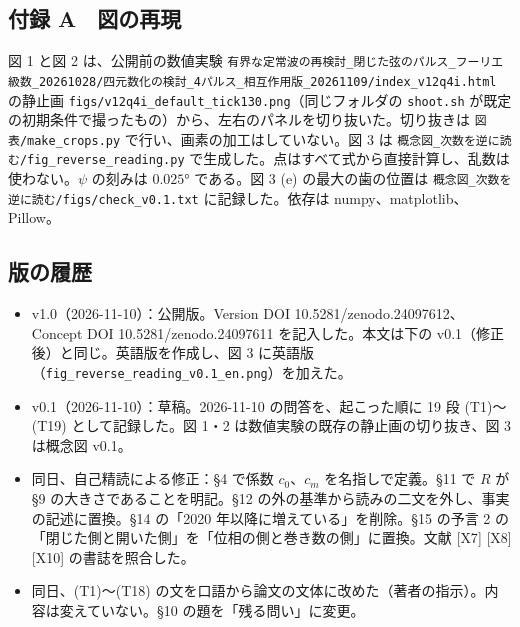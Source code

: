 \documentclass[
  a4paper,
]{ltjsarticle}
\providecommand{\tightlist}{%
  \setlength{\itemsep}{0pt}\setlength{\parskip}{0pt}}
\begin{document}
\subsection{付録
A　図の再現}\label{ux4ed8ux9332-a-ux56f3ux306eux518dux73fe}

図 1 と図 2 は、公開前の数値実験
\texttt{有界な定常波の再検討\_\allowbreak{}閉じた弦のパルス\_\allowbreak{}フーリエ級数\_\allowbreak{}20261028/\allowbreak{}四元数化の検討\_\allowbreak{}4パルス\_\allowbreak{}相互作用版\_\allowbreak{}20261109/\allowbreak{}index\_\allowbreak{}v12q4i.html}
の静止画 \texttt{figs/\allowbreak{}v12q4i\_\allowbreak{}default\_\allowbreak{}tick130.png}（同じフォルダの
\texttt{shoot.sh}
が既定の初期条件で撮ったもの）から、左右のパネルを切り抜いた。切り抜きは
\texttt{図表/\allowbreak{}make\_\allowbreak{}crops.py} で行い、画素の加工はしていない。図 3 は
\texttt{概念図\_\allowbreak{}次数を逆に読む/\allowbreak{}fig\_\allowbreak{}reverse\_\allowbreak{}reading.py}
で生成した。点はすべて式から直接計算し、乱数は使わない。\(\psi\)
の刻みは \(0.025°\) である。図 3 (e) の最大の歯の位置は
\texttt{概念図\_\allowbreak{}次数を逆に読む/\allowbreak{}figs/\allowbreak{}check\_\allowbreak{}v0.1.txt} に記録した。依存は
numpy、matplotlib、Pillow。

\subsection{版の履歴}\label{ux7248ux306eux5c65ux6b74}

\begin{itemize}
\tightlist
\item
  v1.0（2026-11-10）：公開版。Version DOI
  10.5281/zenodo.24097612、Concept DOI 10.5281/zenodo.24097611
  を記入した。本文は下の v0.1（修正後）と同じ。英語版を作成し、図 3
  に英語版（\texttt{fig\_\allowbreak{}reverse\_\allowbreak{}reading\_\allowbreak{}v0.1\_\allowbreak{}en.png}）を加えた。
\item
  v0.1（2026-11-10）：草稿。2026-11-10 の問答を、起こった順に 19 段
  (T1)〜(T19) として記録した。図 1・2
  は数値実験の既存の静止画の切り抜き、図 3 は概念図 v0.1。
\item
  同日、自己精読による修正：§4 で係数 \(c_0\)、\(c_m\)
  を名指しで定義。§11 で \(R\) が §9 の大きさであることを明記。§12
  の外の基準から読みの二文を外し、事実の記述に置換。§14 の「2020
  年以降に増えている」を削除。§15 の予言 2
  の「閉じた側と開いた側」を「位相の側と巻き数の側」に置換。文献
  {[}X7{]} {[}X8{]} {[}X10{]} の書誌を照合した。
\item
  同日、(T1)〜(T18)
  の文を口語から論文の文体に改めた（著者の指示）。内容は変えていない。§10
  の題を「残る問い」に変更。
\end{itemize}
\end{document}
